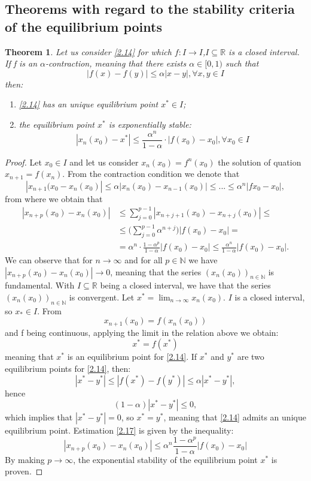 \documentclass[a4paper,11pt]{report}
\newtheorem{theorem}{Theorem}[subsection]
\newcommand{\R}{\mathbb{R}}
\newcommand{\xstar}{x^{*}}
\begin{document}
\subsection{Theorems with regard to the stability criteria of the equilibrium points}
\begin{theorem}
 Let us consider \eqref{2.14} for which $f:I\rightarrow I$,$I\subseteq\R$ is a closed interval. If f is an $\alpha$-contraction, meaning that there exists $\alpha\in [0,1)$ such that
 $$|f(x)-f(y)|\leq \alpha |x-y|, \forall x,y\in I$$
 then:
 \begin{enumerate}
  \item \eqref{2.14} has an unique equilibrium point $\xstar\in I$;
  \item the equilibrium point $\xstar$ is exponentially stable:
  \begin{equation}\label{2.17}
|x_{n}(x_{0})-\xstar|\leq\frac{\alpha^{n}}{1-\alpha}\cdot |f(x_{0})-x_{0}|, \forall x_{0}\in I
\end{equation}
 \end{enumerate}
\end{theorem}
\begin{proof}
 Let $x_{0} \in I$ and let us consider $x_{n}(x_{0})=f^{n}(x_{0})$ the solution of quation $x_{n+1}=f(x_{n})$. From the contraction condition we denote that $$|x_{n+1}(x_{0}-x_{n}(x_{0})|\leq \alpha |x_{n}(x_{0})-x_{n-1}(x_{0})|\leq ... \leq \alpha^{n}|fx_{0}-x_{0}|,$$
 from where we obtain that
 \begin{align*}
  |x_{n+p}(x_{0})-x_{n}(x_{0})| &\leq \sum_{j=0}^{p-1} |x_{n+j+1}(x_{0})-x_{n+j}(x_{0})|\leq \\
  &\leq \bigg(\sum_{j=0}^{p-1} \alpha^{n+j}\bigg) |f(x_{0})-x_{0}|= \\
  &=\alpha^{n}\cdot\frac{1-\alpha^{p}}{1-\alpha}|f(x_{0})-x_{0}|\leq \frac{\alpha^{n}}{1-\alpha}|f(x_{0})-x_{0}|.
 \end{align*}
We can observe that for $n\rightarrow \infty$ and for all $p\in \mathbb{N}$ we have $|x_{n+p}(x_{0})-x_{n}(x_{0})|\rightarrow 0$, meaning that the series $(x_{n}(x_{0}))_{n\in\mathbb{N}}$ is fundamental. With $I\subseteq \R$ being a closed interval, we have that the series $(x_{n}(x_{0}))_{n\in\mathbb{N}}$ is convergent. Let $x^{*}=\lim_{n\rightarrow\infty} x_{n}(x_{0})$. $I$ is a closed interval, so $x_{*}\in I$.
From $$x_{n+1}(x_{0})=f(x_{n}(x_{0}))$$ and f being continuous, applying the limit in the relation above we obtain:
$$x^{*}=f(x^{*})$$ meaning that $x^{*}$ is an equilibrium point for \eqref{2.14}. If $x^{*}$ and $y^{*}$ are two equilibrium points for \eqref{2.14}, then:
$$|x^{*}-y^{*}|\leq|f(x^{*})-f(y^{*})| \leq \alpha|x^{*}-y^{*}|,$$
hence
$$(1-\alpha)|x^{*}-y^{*}|\leq 0,$$
which implies that $|x^{*}-y^{*}|=0$, so $x^{*}=y^{*}$, meaning that \eqref{2.14} admits an unique equilibrium point. Estimation \eqref{2.17} is given by the inequality:
$$|x_{n+p}(x_{0})-x_{n}(x_{0})|\leq \alpha^{n} \frac{1-\alpha^{p}}{1-\alpha}|f(x_{0})-x_{0}|$$
By making $p\rightarrow\infty$, the exponential stability of the equilibrium point $x^{*}$ is proven.

\end{proof}
\end{document}
